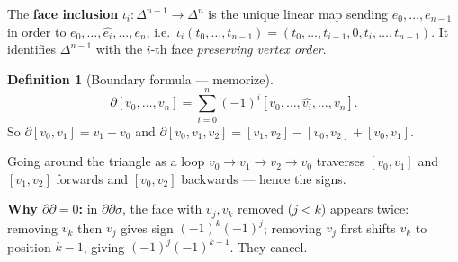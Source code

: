 \documentclass[11pt]{article}
\newcommand{\fig}[2]{\begin{center}\resizebox{#2}{!}{}\end{center}}
\theoremstyle{definition}
\newtheorem{defn}[thm]{Definition}
\begin{document}
The \textbf{face inclusion} $\iota_i:\Delta^{n-1}\to\Delta^n$ is the unique linear map sending $e_0,\dots,e_{n-1}$ in order to $e_0,\dots,\widehat{e_i},\dots,e_n$, i.e.\ $\iota_i(t_0,\dots,t_{n-1})=(t_0,\dots,t_{i-1},0,t_i,\dots,t_{n-1})$. It identifies $\Delta^{n-1}$ with the $i$-th face \emph{preserving vertex order}.

\begin{defn}[Boundary formula --- memorize]
\[\partial[v_0,\dots,v_n]=\sum_{i=0}^n(-1)^i[v_0,\dots,\widehat{v_i},\dots,v_n].\]
So $\partial[v_0,v_1]=v_1-v_0$ and $\partial[v_0,v_1,v_2]=[v_1,v_2]-[v_0,v_2]+[v_0,v_1]$.
\end{defn}

\fig{simplex-boundary}{0.38\textwidth}

Going around the triangle as a loop $v_0\to v_1\to v_2\to v_0$ traverses $[v_0,v_1]$ and $[v_1,v_2]$ forwards and $[v_0,v_2]$ backwards --- hence the signs.

\textbf{Why $\partial\partial=0$:} in $\partial\partial\sigma$, the face with $v_j,v_k$ removed ($j<k$) appears twice: removing $v_k$ then $v_j$ gives sign $(-1)^k(-1)^j$; removing $v_j$ first shifts $v_k$ to position $k-1$, giving $(-1)^j(-1)^{k-1}$. They cancel.
\end{document}

